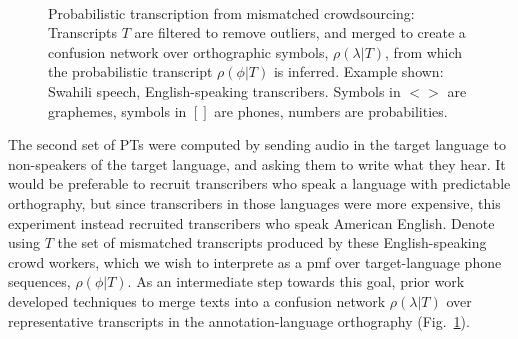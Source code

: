 \begin{figure}[b!]
\begin{center}
\\
\end{center}
\setlength{\abovecaptionskip}{0pt}
\caption{Probabilistic transcription from mismatched crowdsourcing:
  Transcripts $T$ are filtered to remove outliers, and merged to
  create a confusion network over orthographic symbols,
  $\rho(\lambda|T)$, from which the probabilistic transcript
  $\rho(\phi|T)$ is inferred. Example shown: Swahili speech,
  English-speaking transcribers.  Symbols in $<$$>$ are graphemes,
  symbols in $[]$ are phones, numbers are probabilities.}
\label{fig:mcmethods}
\end{figure}

The second set of PTs were computed by sending audio in the target
language to non-speakers of the target language, and asking them to
write what they hear.  It would be preferable to recruit transcribers
who speak a language with predictable orthography, but since
transcribers in those languages were more expensive, this
experiment instead recruited transcribers who speak American English.
Denote using $T$ the set of mismatched
transcripts produced by these English-speaking crowd workers,
which we wish to interprete as a pmf over
target-language phone sequences, $\rho(\phi|T)$.  As an intermediate
step towards this goal, prior work~\cite{JHJ15b} developed techniques
to merge texts into a confusion network
$\rho(\lambda|T)$ over representative transcripts in the
annotation-language orthography (Fig.~\ref{fig:mcmethods}).

